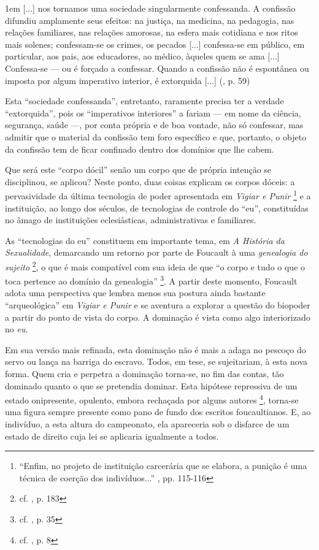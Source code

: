 \documentclass[12pt,a4paper]{article}
\newenvironment{citac}
{
	\begin{addmargin}
		[4cm]{1em} \footnotesize}{\normalfont 
	\end{addmargin}
}
\begin{document}
	\begin{citac}
		[...] nos tornamos uma sociedade singularmente confessanda. A 
		confissão difundiu amplamente seus efeitos: na justiça, na medicina, 
		na pedagogia, nas relações familiares, nas relações amorosas, na 
		esfera mais cotidiana e nos ritos mais solenes; confessam-se os crimes, 
		os pecados [...] confessa-se em público, em particular, aos pais, aos 
		educadores, ao médico, àqueles quem se ama [...] Confessa-se --- ou 
		é forçado a confessar. Quando a confissão não é espontânea ou imposta 
		por algum imperativo interior, é extorquida [...]
		(\cite{hs}, p. 59)		
	\end{citac}

	Esta ``sociedade confessanda'', entretanto, raramente precisa ter a 
	verdade ``extorquida'', pois os ``imperativos interiores'' a fariam 
	--- em nome da ciência, segurança, saúde ---, por conta própria e de 
	boa vontade, não só confessar, mas admitir que o material da confissão 
	tem foro específico e que, portanto, o objeto da confissão tem de ficar 
	confinado dentro dos domínios que lhe cabem. 
	
	Que será este ``corpo dócil'' senão um corpo que de própria intenção se 
	disciplinou, se aplicou? Neste ponto, duas coisas explicam os corpos 
	dóceis: a pervasividade da última tecnologia de poder apresentada em 
	\textit{Vigiar e Punir}
	\footnote{``Enfim, no projeto de instituição carcerária que se elabora, 
	a punição é uma técnica de coerção dos indivíduos...'' 
	\cite{foucault}, pp. 115-116}
	e a instituição, ao longo dos séculos, de tecnologias de controle do 
	``eu'', constituídas no âmago de instituições eclesiásticas, 
	administrativas e familiares. 
	
	As ``tecnologias do eu'' constituem em importante tema, em \textit{A 
	História da Sexualidade}, demarcando um retorno por parte de Foucault 
	à uma \emph{genealogia do sujeito}
		\footnote{cf. \cite{merquior}, p. 183}, 
	o que é mais compatível com sua ideia de que ``o corpo e tudo o que 
	o toca pertence ao domínio da genealogia''
		\footnote{cf. \cite{map}, p. 35}. 
	A partir deste momento, Foucault adota uma perspectiva que lembra menos 
	sua postura ainda bastante ``arqueológica'' em \textit{Vigiar e Punir} 
	e se aventura a explorar a questão do biopoder a partir do ponto de 
	vista do corpo. A dominação é vista como algo interiorizado no \emph{eu}. 
	
	Em sua versão mais refinada, esta dominação não é mais a adaga no pescoço 
	do servo ou lança na barriga do escravo. Todos, em tese, se sujeitariam, 
	à esta nova forma. Quem cria e perpetra a dominação torna-se, no fim das 
	contas, tão dominado quanto o que se pretendia dominar. Esta hipótese 
	repressiva de um estado onipresente, opulento, embora rechaçada por alguns 
	autores
		\footnote{cf. \cite{lebrun}, p. 8}, 
	torna-se uma figura sempre presente como pano de fundo dos escritos 
	foucaultianos. E, ao indivíduo, a esta altura do campeonato, ela 
	apareceria sob o disfarce de um estado de direito cuja lei se aplicaria 
	igualmente a todos. 
	
\end{document}
